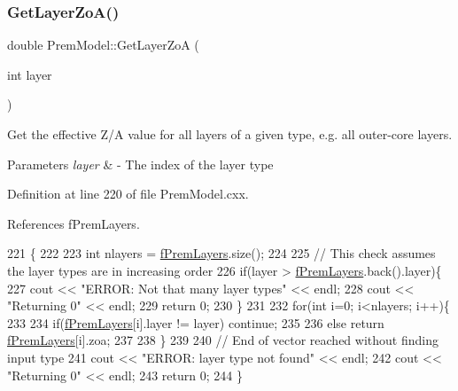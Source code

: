 \subsubsection{\texorpdfstring{Get\+Layer\+Zo\+A()}{GetLayerZoA()}}
{\footnotesize\ttfamily double Prem\+Model\+::\+Get\+Layer\+ZoA (\begin{DoxyParamCaption}\item[{int}]{layer }\end{DoxyParamCaption})\hspace{0.3cm}{\ttfamily [virtual]}}

Get the effective Z/A value for all layers of a given type, e.\+g. all outer-\/core layers.


\begin{DoxyParams}{Parameters}
{\em layer} & -\/ The index of the layer type \\
\hline
\end{DoxyParams}


Definition at line 220 of file Prem\+Model.\+cxx.



References f\+Prem\+Layers.


\begin{DoxyCode}
221 \{
222 
223   \textcolor{keywordtype}{int} nlayers = \hyperlink{classOscProb_1_1PremModel_a19a9a3b23ec154ad7a29f92b74aa5bc6}{fPremLayers}.size();
224 
225   \textcolor{comment}{// This check assumes the layer types are in increasing order}
226   \textcolor{keywordflow}{if}(layer > \hyperlink{classOscProb_1_1PremModel_a19a9a3b23ec154ad7a29f92b74aa5bc6}{fPremLayers}.back().layer)\{
227     cout << \textcolor{stringliteral}{"ERROR: Not that many layer types"} << endl;
228     cout << \textcolor{stringliteral}{"Returning 0"} << endl;
229     \textcolor{keywordflow}{return} 0;
230   \}
231 
232   \textcolor{keywordflow}{for}(\textcolor{keywordtype}{int} i=0; i<nlayers; i++)\{
233 
234     \textcolor{keywordflow}{if}(\hyperlink{classOscProb_1_1PremModel_a19a9a3b23ec154ad7a29f92b74aa5bc6}{fPremLayers}[i].layer != layer) \textcolor{keywordflow}{continue};
235 
236     \textcolor{keywordflow}{else} \textcolor{keywordflow}{return} \hyperlink{classOscProb_1_1PremModel_a19a9a3b23ec154ad7a29f92b74aa5bc6}{fPremLayers}[i].zoa;
237 
238   \}
239 
240   \textcolor{comment}{// End of vector reached without finding input type}
241   cout << \textcolor{stringliteral}{"ERROR: layer type not found"} << endl;
242   cout << \textcolor{stringliteral}{"Returning 0"} << endl;
243   \textcolor{keywordflow}{return} 0;
244 \}
\end{DoxyCode}
\mbox{\label{classOscProb_1_1PremModel_a5b6f83f2e9b7087e8faad1f19f00ebd5}} 
